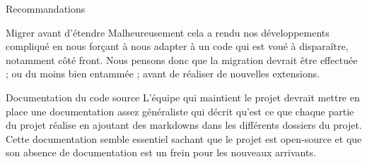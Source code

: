 \documentclass[]{article}
\begin{document}
{\begin{section}{Recommandations}
\begin{subsection}{Migrer avant d'étendre}
     Malheureusement cela a rendu nos développements compliqué en nous forçant à nous adapter à un code qui est voué à disparaître, notamment côté front. Nous pensons donc que la migration devrait être effectuée ; ou du moins bien entammée ; avant de réaliser de nouvelles extensions.
 \end{subsection}

 \begin{subsection}{Documentation du code source}
     L'équipe qui maintient le projet devrait mettre en place une documentation assez généraliste qui décrit qu'est ce que chaque partie du projet réalise en ajoutant des markdowns dans les différents dossiers du projet. Cette documentation semble essentiel sachant que le projet est open-source et que son absence de documentation est un frein pour les nouveaux arrivants.
 \end{subsection}
\end{section}

}
\end{document}
